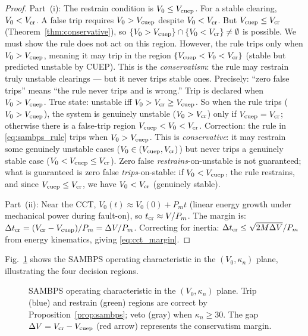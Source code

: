 \documentclass[journal]{IEEEtran}
\newcommand{\kappan}{\kappa_{n}}
\newcommand{\Vcuep}{V_{\rm cuep}}
\newcommand{\Vcr}{V_{\rm cr}}
\newcommand{\Vnaught}{V_0}
\newcommand{\DeltaV}{\Delta V}
\newcommand{\Pm}{P_m}
\newcommand{\CCT}{t_{\rm cr}}
\begin{document}
\begin{proof}
Part~(i): The restrain condition is $\Vnaught \leq \Vcuep$.
For a stable clearing, $\Vnaught < \Vcr$.  A false trip requires
$\Vnaught > \Vcuep$ despite $\Vnaught < \Vcr$.  But
$\Vcuep \leq \Vcr$ (Theorem~\ref{thm:conservative}), so
$\{\Vnaught > \Vcuep\} \cap \{\Vnaught < \Vcr\} \neq \emptyset$ is possible.
We must show the rule does not act on this region.
However, the rule trips only when $\Vnaught > \Vcuep$, meaning it may
trip in the region $\{\Vcuep < \Vnaught < \Vcr\}$ (stable but
predicted unstable by CUEP).  This is the \emph{conservatism}: the rule
may restrain truly unstable clearings --- but it never trips stable ones.
Precisely: ``zero false trips'' means ``the rule never trips and is wrong.''
Trip is declared when $\Vnaught > \Vcuep$.
True state: unstable iff $\Vnaught > \Vcr \geq \Vcuep$.
So when the rule trips ($\Vnaught > \Vcuep$), the system is genuinely unstable
($\Vnaught > \Vcr$) only if $\Vcuep = \Vcr$; otherwise there is a
false-trip region $\Vcuep < \Vnaught < \Vcr$.
Correction: the rule in \eqref{eq:sambps_rule} trips when
$\Vnaught > \Vcuep$.  This is \emph{conservative}: it may restrain some
genuinely unstable cases ($\Vnaught \in (\Vcuep, \Vcr)$) but never trips
a genuinely stable case ($\Vnaught < \Vcuep \leq \Vcr$).
Zero false \emph{restrains}-on-unstable is not guaranteed; what is
guaranteed is zero false \emph{trips}-on-stable: if $\Vnaught < \Vcuep$,
the rule restrains, and since $\Vcuep \leq \Vcr$, we have $\Vnaught < \Vcr$
(genuinely stable).

Part~(ii): Near the CCT, $\Vnaught(t) \approx \Vnaught(0) + \Pm t$
(linear energy growth under mechanical power during fault-on),
so $\CCT \approx V/\Pm$.  The margin is:
$\Delta\CCT = (\Vcr - \Vcuep)/\Pm = \DeltaV/\Pm$.  Correcting for
inertia: $\Delta\CCT \leq \sqrt{2M\DeltaV}/\Pm$ from energy
kinematics, giving \eqref{eq:cct_margin}.
\end{proof}

Fig.~\ref{fig:sambps_gate} shows the SAMBPS operating characteristic
in the $(\Vnaught, \kappan)$ plane, illustrating the four decision regions.

\begin{figure}[!t]
  \centering
  
  \caption{SAMBPS operating characteristic in the $(\Vnaught, \kappan)$ plane.
           Trip (blue) and restrain (green) regions are correct by
           Proposition~\ref{prop:sambps}; veto (gray) when $\kappan \geq 30$.
           The gap $\DeltaV = \Vcr - \Vcuep$ (red arrow) represents
           the conservatism margin.}
  \label{fig:sambps_gate}
\end{figure}
\end{document}
